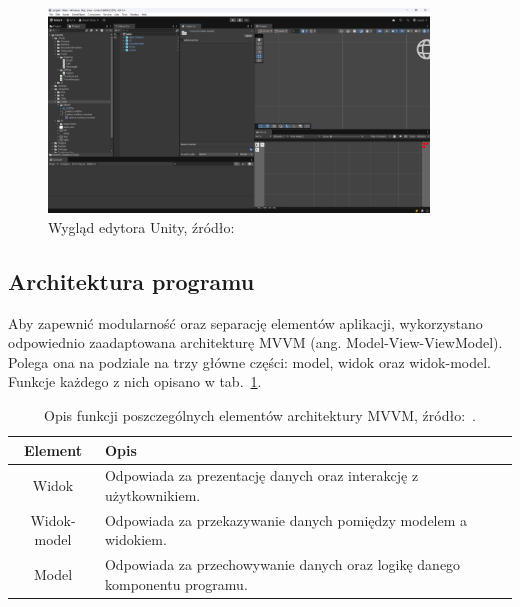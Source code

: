 \begin{figure}[h]
    \centering
    \includegraphics[width=0.9\textwidth]{chapters/chapter3/rys/unity_editor}
    \caption[Widok okna edytora Unity]{Wygląd edytora Unity, źródło: \cite{unity_site}}
    \label{fig:unity_editor}
\end{figure}

\subsection{Architektura programu}
\label{subsec:architektura_programu}

Aby zapewnić modularność oraz separację elementów aplikacji,
wykorzystano odpowiednio zaadaptowana architekturę MVVM (ang. Model-View-ViewModel).
Polega ona na podziale na trzy główne części: model, widok oraz widok-model.
Funkcje każdego z nich opisano w tab.~\ref{tab:mvvm}.

\begin{table}[h]
    \centering
    \caption[Opis funkcji poszczególnych elementów architektury MVVM.]
    {Opis funkcji poszczególnych elementów architektury MVVM, źródło:~\cite{mvvm}.}
    \label{tab:mvvm}
    \begin{tabular}{|c|p{}|}
        \hline
        Element & Opis \\
        \hline
        \hline
        Widok & Odpowiada za prezentację danych oraz interakcję z użytkownikiem. \\
        \hline
        Widok-model & Odpowiada za przekazywanie danych pomiędzy modelem a widokiem. \\
        \hline
        Model & Odpowiada za przechowywanie danych oraz logikę danego komponentu programu. \\
        \hline
    \end{tabular}
\end{table}

